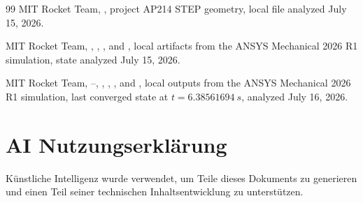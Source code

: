 \documentclass[oneside,openany]{amsdtx}
\begin{document}
\begin{thebibliography}{99}
MIT Rocket Team, , project AP214 STEP geometry, local file
analyzed July 15, 2026.

MIT Rocket Team, , ,
, and , local artifacts
from the ANSYS Mechanical 2026 R1 simulation, state analyzed July 15, 2026.

MIT Rocket Team, --, ,
, , and
, local outputs from the ANSYS Mechanical
2026 R1 simulation, last converged state at \(t=\SI{6.38561694}{s}\), analyzed
July 16, 2026.

\end{thebibliography}

\clearpage
\renewcommand{\listfigurename}{Abbildungsverzeichnis}
\renewcommand{\listtablename}{Tabellenverzeichnis}
\listoffigures
\listoftables

\vfill
\section*{AI Nutzungserklärung}

Künstliche Intelligenz wurde verwendet, um Teile dieses Dokuments zu generieren und einen Teil seiner technischen Inhaltsentwicklung zu unterstützen.
\end{document}
